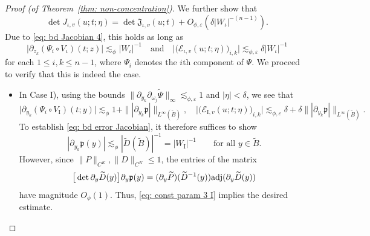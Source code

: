 \documentclass[reqno]{amsart}
\numberwithin{equation}{section}
\newcommand{\cE}{\mathcal{E}}
\newcommand{\fJ}{\mathfrak{J}}
\newcommand{\fp}{\mathfrak{p}}
\theoremstyle{plain}
\theoremstyle{definition}
\newcommand{\tI}{\mathrm{I}}
\begin{document}
\begin{proof}[Proof (of Theorem~\ref{thm: non-concentration})]
We further show that
\begin{equation}\label{eq: bd error Jacobian}
    \det J_{\iota,v}(u;t;\eta)=\det \fJ_{\iota,v}(u;t) + O_{\phi, \varepsilon}(\delta |W_\iota|^{-(n-1)}).
\end{equation}
Due to \eqref{eq: bd Jacobian 4}, this holds as long as 
\begin{equation*}
  \big|\partial_{z_k}(\Psi_i \circ V_{\iota})(t;z)\big| \lesssim_{\phi} |W_\iota|^{-1} \quad \textrm{and} \quad   \big|\big(\cE_{\iota,v}(u;t;\eta)\big)_{i,k}\big| \lesssim_{\phi, \varepsilon} \delta |W_\iota|^{-1}
\end{equation*} for each $1 \leq i, k \leq n-1$, where $\Psi_i$ denotes the $i$th component of $\Psi$. We proceed to verify that this is indeed the case.
\begin{itemize}
    \item In Case I), using the bounds $\|\partial_{y_k}\partial_{\omega_j}\widetilde{\Psi}\|_{\infty} \lesssim_{\phi, \varepsilon} 1$ and $|\eta| < \delta$, we see that
\begin{equation*}
   \big|\partial_{y_k}(\Psi_i \circ V_{\tI})(t;y)\big| \lesssim_{\phi} 1 + \||\partial_{y_k}\fp|\|_{L^{\infty}(\widetilde{B})}, \quad  \big|\big(\cE_{\tI,v}(u;t;\eta)\big)_{i,k}\big| \lesssim_{\phi, \varepsilon} \delta + \delta\||\partial_{y_k}\fp|\|_{L^{\infty}(\widetilde{B})}.
\end{equation*}
To establish \eqref{eq: bd error Jacobian}, it therefore suffices to show 
\begin{equation*}
    |\partial_{y_k}\fp(y)|\lesssim_\phi |\widetilde{D}(\widetilde{B})|^{-1}=|W_{\tI}|^{-1} \qquad \textrm{for all $y\in \widetilde{B}$.}
\end{equation*}
However, since $\|P\|_{C^K}, \|D\|_{C^K}\leq 1$, the entries of the matrix
\begin{equation*}
   \big[\det\partial_y\widetilde{D}(y)\big] \partial_y\fp(y)=(\partial_y\widetilde{P})(\widetilde{D}^{-1}(y)){\rm adj}(\partial_y\widetilde{D}(y))
\end{equation*}
have magnitude $O_\phi(1)$. Thus, \eqref{eq: const param 3 I} implies the desired estimate. 


\end{itemize}
\end{proof}
\end{document}
